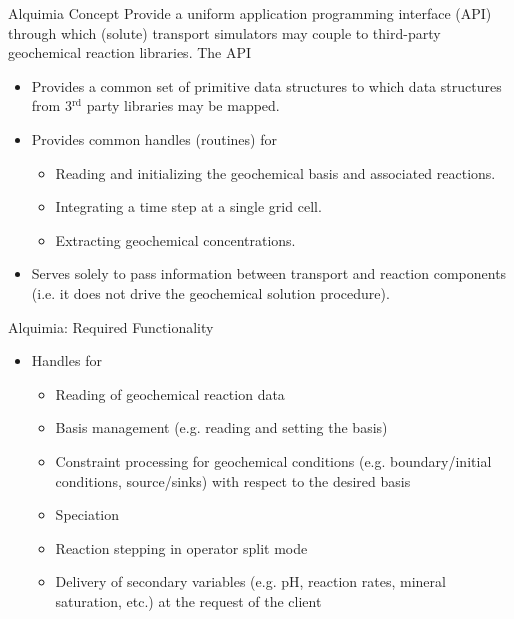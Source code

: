 \documentclass{beamer}
\begin{document}
\begin{frame}{Alquimia Concept}
Provide a uniform application programming interface (API) through which (solute) transport simulators may couple to third-party geochemical reaction libraries.  The API
\begin{itemize}
\item Provides a common set of primitive data structures to which data structures from 3$^\text{rd}$ party libraries may be mapped.
\item Provides common handles (routines) for
\begin{itemize}
\item Reading and initializing the geochemical basis and associated reactions.
\item Integrating a time step at a single grid cell.
\item Extracting geochemical concentrations.
\end{itemize}
\item Serves solely to pass information between transport and reaction components (i.e. it does not drive the geochemical solution procedure).
\end{itemize}
\end{frame}

\begin{frame}{Alquimia: Required Functionality}
\begin{itemize}
\item Handles for
\begin{itemize}
\item Reading of geochemical reaction data
\item Basis management (e.g. reading and setting the basis)
\item Constraint processing for geochemical conditions (e.g. boundary/initial conditions, source/sinks) with respect to the desired basis
\item Speciation
\item Reaction stepping in operator split mode
\item Delivery of secondary variables (e.g. pH, reaction rates, mineral saturation, etc.) at the request of the client
\end{itemize}
\end{itemize}
\end{frame}
\end{document}

